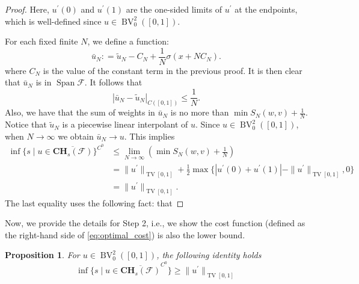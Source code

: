 \documentclass[12pt]{amsart}
\numberwithin{equation}{section}
\newtheorem{proposition}{Proposition}[section]
\theoremstyle{remark}
\begin{document}
\begin{proof}
Here, $u^\prime(0)$ and $u^\prime(1)$ are the one-sided limits of $u^\prime$ at the endpoints, which is well-defined since $u\in \operatorname{BV}_0^2([0,1])$.

For each fixed finite $N$, we define a function:
\begin{equation}
    \bar u_N: = \tilde u_N - C_N + \frac{1}{N}\sigma(x+N C_N).
\end{equation}
where $C_N$ is the value of the constant term in the previous proof. It is then clear that $\bar u_N$ is in $\operatorname{Span} \mathcal F$. It follows that
\begin{equation}
    |\bar u_N-\tilde u_N|_{C([0,1])}\le \frac{1}{N}.
\end{equation}
Also, we have that the sum of weights in $\bar u_N$ is no more than $\min S_N(w,v)+\frac{1}{N}$. Notice that $\tilde u_N$ is a piecewise linear interpolant of $u$. 
Since $u \in \operatorname{BV}^2_0([0,1])$, when $N\to \infty$ we obtain $\bar u_N\to u$.
This implies
\begin{equation}
    \label{eq:optimal_cost}
    \begin{aligned}
            \operatorname{inf}\{ s \mid u\in \overline{\mathbf{CH}_s(\mathcal F)}\}^{C^0}&\le \lim_{N\to \infty} \left(\min S_N(w,v)+\frac1 N\right)\\
            &= \|u^\prime\|_{\operatorname{TV}[0,1]} + \frac{1}{2} \max\{|u^\prime(0)+u^\prime(1)| - \|u^\prime\|_{\operatorname{TV}[0,1]}, 0\}\\
            & = \|u^\prime\|_{\operatorname{TV}[0,1]}.
    \end{aligned}
\end{equation}
The last equality uses the following fact: that

\end{proof}



Now, we provide the details for Step 2, i.e., we show the cost function (defined as the right-hand side of \eqref{eq:optimal_cost}) is also the lower bound.

\begin{proposition}
    \label{prop:interpolation_lower_bound}
    For $ u \in \operatorname{BV}^2_0([0,1])$, the following identity holds
    \begin{equation}
        \inf \{ s \mid u \in \overline{\mathbf{CH}_s(\mathcal F)}^{C^0}\}
         \ge \|{u^\prime}\|_{\operatorname{TV}[0,1]}
    \end{equation}
\end{proposition}
\end{document}
